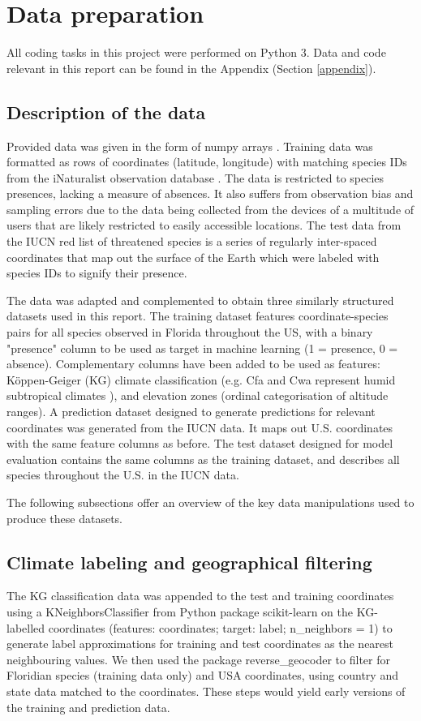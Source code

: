 \documentclass{article}
\begin{document}
\section{Data preparation}

All coding tasks in this project were performed on Python 3. Data and code relevant in this report can be found in the Appendix (Section \ref{appendix}).

\subsection{Description of the data}

Provided data was given in the form of numpy arrays \cite{numpy}. Training data was formatted as rows of coordinates (latitude, longitude) with matching species IDs from the iNaturalist observation database \cite{inaturalist}. The data is restricted to species presences, lacking a measure of absences. It also suffers from observation bias and sampling errors due to the data being collected from the devices of a multitude of users that are likely restricted to easily accessible locations. 
The test data from the IUCN red list of threatened species \cite{iucndata} is a series of regularly inter-spaced coordinates that map out the surface of the Earth which were labeled with species IDs to signify their presence.

The data was adapted and complemented to obtain three similarly structured datasets used in this report. The training dataset features coordinate-species pairs for all species observed in Florida throughout the US, with a binary "presence" column to be used as target in machine learning (1 = presence, 0 = absence). Complementary columns have been added to be used as features: Köppen-Geiger (KG) climate classification (e.g. Cfa and Cwa represent humid subtropical climates \cite{KG}), and elevation zones (ordinal categorisation of altitude ranges). A prediction dataset designed to generate predictions for relevant coordinates was generated from the IUCN data. It maps out U.S. coordinates with the same feature columns as before. The test dataset designed for model evaluation contains the same columns as the training dataset, and describes all species throughout the U.S. in the IUCN data.  

The following subsections offer an overview of the key data manipulations used to produce these datasets.

\subsection{Climate labeling and geographical filtering}
The KG classification data\cite{KG} was appended to the test and training coordinates using a KNeighborsClassifier from Python package scikit-learn \cite{scikit-learn} on the KG-labelled coordinates (features: coordinates; target: label; n\_neighbors = 1) to generate label approximations for training and test coordinates as the nearest neighbouring values.
 We then used the package reverse\_geocoder \cite{rev-geo} to filter for Floridian species (training data only) and USA coordinates, using country and state data matched to the coordinates. These steps would yield early versions of the training and prediction data.
\end{document}
